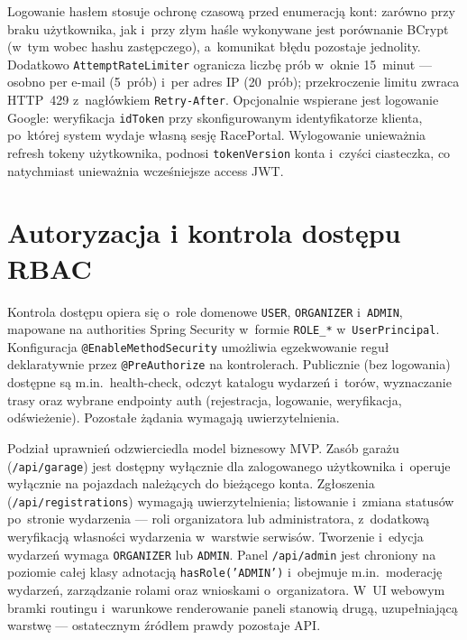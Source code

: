 \documentclass{sprz}
\begin{document}
Logowanie hasłem stosuje ochronę czasową przed enumeracją kont: zarówno przy braku użytkownika, jak i~przy złym haśle wykonywane jest porównanie BCrypt (w~tym wobec hashu zastępczego), a~komunikat błędu pozostaje jednolity. Dodatkowo \texttt{AttemptRateLimiter} ogranicza liczbę prób w~oknie 15~minut --- osobno per e-mail (5~prób) i~per adres IP (20~prób); przekroczenie limitu zwraca HTTP~429 z~nagłówkiem \texttt{Retry-After}. Opcjonalnie wspierane jest logowanie Google: weryfikacja \texttt{idToken} przy skonfigurowanym identyfikatorze klienta, po~której system wydaje własną sesję RacePortal. Wylogowanie unieważnia refresh tokeny użytkownika, podnosi \texttt{tokenVersion} konta i~czyści ciasteczka, co natychmiast unieważnia wcześniejsze access JWT.

\section{Autoryzacja i kontrola dostępu RBAC}
Kontrola dostępu opiera się o~role domenowe \texttt{USER}, \texttt{ORGANIZER} i~\texttt{ADMIN}, mapowane na authorities Spring Security w~formie \texttt{ROLE\_*} w~\texttt{UserPrincipal}. Konfiguracja \texttt{@EnableMethodSecurity} umożliwia egzekwowanie reguł deklaratywnie przez \texttt{@PreAuthorize} na kontrolerach. Publicznie (bez logowania) dostępne są m.in.\ health-check, odczyt katalogu wydarzeń i~torów, wyznaczanie trasy oraz wybrane endpointy auth (rejestracja, logowanie, weryfikacja, odświeżenie). Pozostałe żądania wymagają uwierzytelnienia.

Podział uprawnień odzwierciedla model biznesowy MVP. Zasób garażu (\texttt{/api/garage}) jest dostępny wyłącznie dla zalogowanego użytkownika i~operuje wyłącznie na pojazdach należących do bieżącego konta. Zgłoszenia (\texttt{/api/registrations}) wymagają uwierzytelnienia; listowanie i~zmiana statusów po~stronie wydarzenia --- roli organizatora lub administratora, z~dodatkową weryfikacją własności wydarzenia w~warstwie serwisów. Tworzenie i~edycja wydarzeń wymaga \texttt{ORGANIZER} lub \texttt{ADMIN}. Panel \texttt{/api/admin} jest chroniony na poziomie całej klasy adnotacją \texttt{hasRole('ADMIN')} i~obejmuje m.in.\ moderację wydarzeń, zarządzanie rolami oraz wnioskami o~organizatora. W~UI webowym bramki routingu i~warunkowe renderowanie paneli stanowią drugą, uzupełniającą warstwę --- ostatecznym źródłem prawdy pozostaje API.
\end{document}
